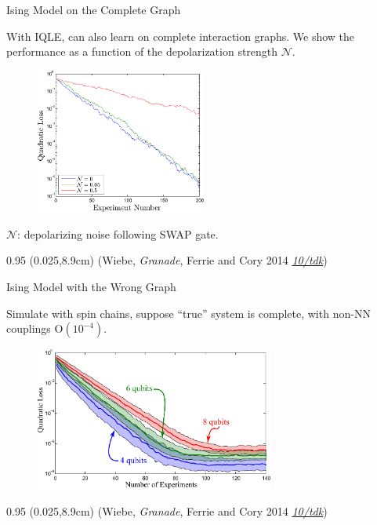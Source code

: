 \documentclass[xcolor=dvipsnames, compress]{beamer}
\renewcommand\UrlFont{\color{red}\rmfamily\itshape}
\newcommand{\shortdoi}[1]{\href{http://doi.org/#1}{\UrlFont 10/#1}}
\newcommand{\OO}{\mathrm{O}}
\newcommand{\bottomnote}[1]{
  \begin{textblock*}{0.95\paperwidth} (0.025\paperwidth,8.9cm)
    {\tiny \hfill #1}
  \end{textblock*}
}
\begin{document}
\begin{frame}{Ising Model on the Complete Graph}
    
    With IQLE, can also learn on complete interaction graphs.
    We show the performance as a function of
    the depolarization strength $\mathcal{N}$.
    
    \begin{figure}
      \centering
      \includegraphics[width=0.5\textwidth]{tpnoise}
    \end{figure}

    $\mathcal{N}$: depolarizing noise following SWAP gate.

  \bottomnote{(Wiebe, \emph{Granade}, Ferrie and Cory 2014 \shortdoi{tdk})}
    
\end{frame}

\begin{frame}{Ising Model with the Wrong Graph}

  Simulate with spin chains, suppose ``true'' system is complete,
  with non-NN couplings $\OO(10^{-4})$.

  \begin{figure}
    \centering
    \includegraphics[width=0.7\textwidth]{badmodel}
  \end{figure}

  \bottomnote{(Wiebe, \emph{Granade}, Ferrie and Cory 2014 \shortdoi{tdk})}

\end{frame}
\end{document}
